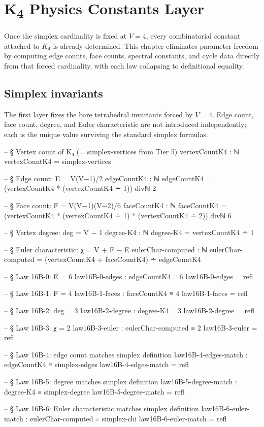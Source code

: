 \documentclass[11pt,a4paper]{book}
\begin{document}
\chapter{K\textsubscript{4} Physics Constants Layer}

Once the simplex cardinality is fixed at $V = 4$, every combinatorial constant attached to $K_4$ is already determined. This chapter eliminates parameter freedom by computing edge counts, face counts, spectral constants, and cycle data directly from that forced cardinality, with each law collapsing to definitional equality.

\section{Simplex invariants}

The first layer fixes the bare tetrahedral invariants forced by $V = 4$. Edge count, face count, degree, and Euler characteristic are not introduced independently; each is the unique value surviving the standard simplex formulas.

\begin{code}
-- § Vertex count of K₄ (= simplex-vertices from Tier 5)
vertexCountK4 : ℕ
vertexCountK4 = simplex-vertices

-- § Edge count: E = V(V−1)/2
edgeCountK4 : ℕ
edgeCountK4 = (vertexCountK4 * (vertexCountK4 ∸ 1)) divℕ 2

-- § Face count: F = V(V−1)(V−2)/6
faceCountK4 : ℕ
faceCountK4 = (vertexCountK4 * (vertexCountK4 ∸ 1) * (vertexCountK4 ∸ 2)) divℕ 6

-- § Vertex degree: deg = V − 1
degree-K4 : ℕ
degree-K4 = vertexCountK4 ∸ 1

-- § Euler characteristic: χ = V + F − E
eulerChar-computed : ℕ
eulerChar-computed = (vertexCountK4 + faceCountK4) ∸ edgeCountK4

-- § Law 16B-0: E = 6
law16B-0-edges : edgeCountK4 ≡ 6
law16B-0-edges = refl

-- § Law 16B-1: F = 4
law16B-1-faces : faceCountK4 ≡ 4
law16B-1-faces = refl

-- § Law 16B-2: deg = 3
law16B-2-degree : degree-K4 ≡ 3
law16B-2-degree = refl

-- § Law 16B-3: χ = 2
law16B-3-euler : eulerChar-computed ≡ 2
law16B-3-euler = refl

-- § Law 16B-4: edge count matches simplex definition
law16B-4-edges-match : edgeCountK4 ≡ simplex-edges
law16B-4-edges-match = refl

-- § Law 16B-5: degree matches simplex definition
law16B-5-degree-match : degree-K4 ≡ simplex-degree
law16B-5-degree-match = refl

-- § Law 16B-6: Euler characteristic matches simplex definition
law16B-6-euler-match : eulerChar-computed ≡ simplex-chi
law16B-6-euler-match = refl
\end{code}
\end{document}
